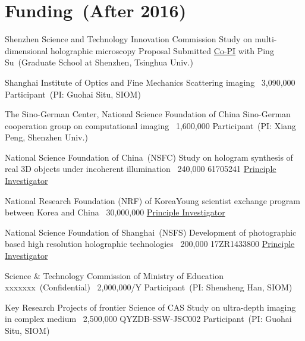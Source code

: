 \documentclass[10pt,a4paper]{moderncv}
\begin{document}

\section{Funding~(After 2016)}
\cventry{}
{Shenzhen Science and Technology Innovation Commission}
{Study on multi-dimensional holographic microscopy}
{Proposal Submitted}
{}
{\underline{Co-PI} with Ping Su~(Graduate School at Shenzhen, Tsinghua Univ.)}

{Shanghai Institute of Optics and Fine Mechanics}
{Scattering imaging}
{\textyen~3,090,000}
{}
{Participant~(PI: Guohai Situ, SIOM)}

{The Sino-German Center, National Science Foundation of China}
{Sino-German cooperation group on computational imaging}
{\textyen~1,600,000}
{}
{Participant~(PI: Xiang Peng, Shenzhen Univ.)}

{National Science Foundation of China~(NSFC)}
{Study on hologram synthesis of real 3D objects under incoherent illumination}
{\textyen~24\textbf{}0,000}
{61705241}
{\underline{Principle Investigator}}

{National Research Foundation (NRF) of Korea}{Young scientist exchange program between Korea and China}
{\textwon~30,000,000}
{}
{\underline{Principle Investigator}}

{National Science Foundation of Shanghai~(NSFS)}
{Development of photographic based \linebreak high resolution holographic technologies}
{\textyen~200,000}
{17ZR1433800}
{\underline{Principle Investigator}}

{Science \& Technology Commission of Ministry of Education}
{xxxxxxx~(Confidential)}
{\textyen~2,000,000/Y}
{}
{Participant~(PI: Shensheng Han, SIOM)}

{Key Research Projects of frontier Science of CAS}
{Study on ultra-depth imaging in complex medium}
{\textyen~2,500,000}
{QYZDB-SSW-JSC002}
{Participant~(PI: Guohai Situ, SIOM)}
\end{document}

